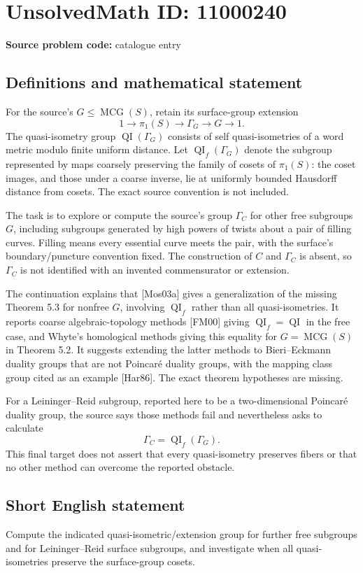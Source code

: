 \documentclass[11pt]{article}
\begin{document}
\section*{UnsolvedMath ID: 11000240}
\textbf{Source problem code:} catalogue entry
\subsection{Definitions and mathematical statement}
For the source's \(G\leq\operatorname{MCG}(S)\), retain its surface-group extension
\[
 1\longrightarrow\pi_1(S)\longrightarrow\Gamma_G\longrightarrow G\longrightarrow1.
\]
The quasi-isometry group \(\operatorname{QI}(\Gamma_G)\) consists of self quasi-isometries of a word metric modulo finite uniform distance. Let \(\operatorname{QI}_f(\Gamma_G)\) denote the subgroup represented by maps coarsely preserving the family of cosets of \(\pi_1(S)\): the coset images, and those under a coarse inverse, lie at uniformly bounded Hausdorff distance from cosets. The exact source convention is not included.

The task is to explore or compute the source's group \(\Gamma_C\) for other free subgroups \(G\), including subgroups generated by high powers of twists about a pair of filling curves. Filling means every essential curve meets the pair, with the surface's boundary/puncture convention fixed. The construction of \(C\) and \(\Gamma_C\) is absent, so \(\Gamma_C\) is not identified with an invented commensurator or extension.

The continuation explains that [Mos03a] gives a generalization of the missing Theorem 5.3 for nonfree \(G\), involving \(\operatorname{QI}_f\) rather than all quasi-isometries. It reports coarse algebraic-topology methods [FM00] giving \(\operatorname{QI}_f=\operatorname{QI}\) in the free case, and Whyte's homological methods giving this equality for \(G=\operatorname{MCG}(S)\) in Theorem 5.2. It suggests extending the latter methods to Bieri--Eckmann duality groups that are not Poincar\'e duality groups, with the mapping class group cited as an example [Har86]. The exact theorem hypotheses are missing.

For a Leininger--Reid subgroup, reported here to be a two-dimensional Poincar\'e duality group, the source says those methods fail and nevertheless asks to calculate
\[
 \Gamma_C=\operatorname{QI}_f(\Gamma_G).
\]
This final target does not assert that every quasi-isometry preserves fibers or that no other method can overcome the reported obstacle.
\subsection{Short English statement}
Compute the indicated quasi-isometric/extension group for further free subgroups and for Leininger--Reid surface subgroups, and investigate when all quasi-isometries preserve the surface-group cosets.
\end{document}
